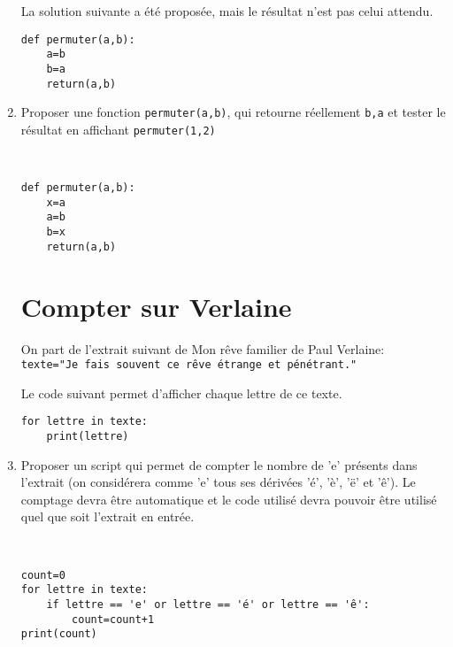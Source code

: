 \begin{enumerate}
La solution suivante a été proposée, mais le résultat n'est pas celui attendu.

\begin{verbatim}
def permuter(a,b):
    a=b
    b=a
    return(a,b)
\end{verbatim}

\item Proposer une fonction \verb?permuter(a,b)?, qui retourne réellement \verb?b,a? et tester le résultat en affichant \verb?permuter(1,2)?

\begin{solution}~\ \\
\begin{verbatim}
def permuter(a,b):
    x=a
    a=b
    b=x
    return(a,b)
\end{verbatim}
\end{solution}

\section*{Compter sur Verlaine}

On part de l'extrait suivant de \og Mon rêve familier \fg de Paul Verlaine:\\
 \verb?texte="Je fais souvent ce rêve étrange et pénétrant."?

Le code suivant permet d'afficher chaque lettre de ce texte.
\begin{verbatim}
for lettre in texte:
    print(lettre)
\end{verbatim}

\item Proposer un script qui permet de compter le nombre de 'e' présents dans l'extrait (on considérera comme 'e' tous ses dérivées 'é', 'è', 'ë' et 'ê'). Le comptage devra être automatique et le code utilisé devra pouvoir être utilisé quel que soit l'extrait en entrée.

\begin{solution}~\ \\
\begin{verbatim}
count=0
for lettre in texte:
    if lettre == 'e' or lettre == 'é' or lettre == 'ê':
        count=count+1
print(count)
\end{verbatim}
\end{solution}

\end{enumerate}

